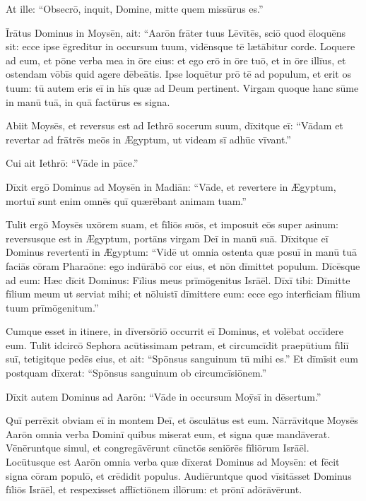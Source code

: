 At ille: ``Obsecrō, inquit, Domine,
mitte quem missūrus es.''

Īrātus Dominus in Moysēn, ait: ``Aarōn frāter tuus Lēvītēs,
sciō quod ēloquēns sit: ecce ipse ēgreditur in occursum tuum,
vidēnsque tē lætābitur corde.
Loquere ad eum, et pōne verba mea in ōre eius:
et ego erō in ōre tuō, et in ōre illīus,
et ostendam vōbīs quid agere dēbeātis.
Ipse loquētur prō tē ad populum,
et erit os tuum:
tū autem eris eī in hīs quæ ad Deum pertinent.
Virgam quoque hanc sūme in manū tuā,
in quā factūrus es signa.

Abiit Moysēs, et reversus est ad Iethrō socerum suum,
dīxitque eī: ``Vādam et revertar ad frātrēs meōs in Ægyptum,
ut videam sī adhūc vīvant.''

Cui ait Iethrō: ``Vāde in pāce.''

Dīxit ergō Dominus ad Moysēn in Madiān: ``Vāde, et revertere in Ægyptum,
mortuī sunt enim omnēs quī quærēbant animam tuam.''

Tulit ergō Moysēs uxōrem suam, et fīliōs suōs,
et imposuit eōs super asinum: reversusque est in Ægyptum,
portāns virgam Deī in manū suā. Dīxitque eī Dominus revertentī
in Ægyptum: ``Vidē ut omnia ostenta quæ posuī in manū tuā
faciās cōram Pharaōne: ego indūrābō cor eius,
et nōn dīmittet populum. Dīcēsque ad eum: Hæc
dīcit Dominus: Fīlius meus prīmōgenitus Isrāēl.
Dīxī tibi: Dīmitte fīlium meum ut serviat mihi;
et nōluistī dīmittere eum:
ecce ego interficiam fīlium tuum prīmōgenitum.''

Cumque esset in itinere, in dīversōriō
occurrit eī Dominus, et volēbat occīdere eum. 
Tulit idcircō Sephora acūtissimam petram,
et circumcīdit praepūtium fīliī suī, tetigitque pedēs eius,
et ait: ``Spōnsus sanguinum tū mihi es.''
Et dīmīsit eum postquam dīxerat: ``Spōnsus sanguinum ob circumcīsiōnem.''

Dīxit autem Dominus ad Aarōn: ``Vāde in occursum Moȳsī
in dēsertum.'' 

Quī perrēxit obviam eī in montem Deī, et ōsculātus est eum.
Nārrāvitque Moysēs Aarōn omnia verba Dominī quibus miserat eum,
et signa quæ mandāverat. Vēnēruntque simul, et congregāvērunt
cūnctōs seniōrēs fīliōrum Isrāēl.
Locūtusque est Aarōn omnia verba quæ dīxerat Dominus ad Moysēn: et
fēcit signa cōram populō, et crēdidit populus.
Audiēruntque quod vīsitāsset Dominus fīliōs Isrāēl,
et respexisset afflīctiōnem illōrum: et prōnī adōrāvērunt.
